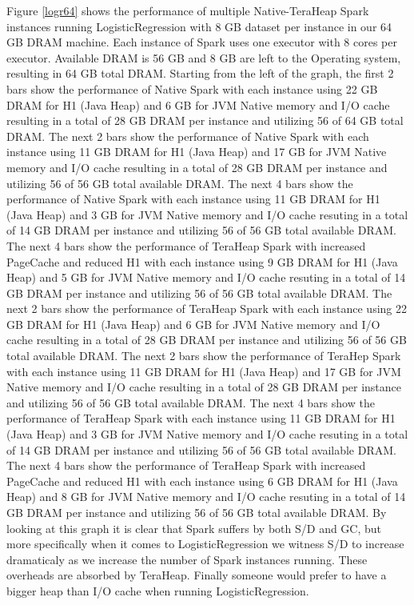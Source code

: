 \documentclass[twocolumn,10pt]{asme2e}
\begin{document}
Figure \ref{logr64} shows the performance of multiple Native-TeraHeap Spark instances running LogisticRegression with 8 GB dataset per instance in our 64 GB DRAM machine. Each instance of Spark uses one executor with 8 cores per executor. Available DRAM is 56 GB and 8 GB are left to the Operating system, resulting in 64 GB total DRAM. Starting from the left of the graph, the first 2 bars show the performance of Native Spark with each instance using 22 GB DRAM for H1 (Java Heap) and 6 GB for JVM Native memory and I/O cache resulting in a total of 28 GB DRAM per instance and utilizing 56 of 64 GB total DRAM. The next 2 bars show the performance of Native Spark with each instance using 11 GB DRAM for H1 (Java Heap) and 17 GB for JVM Native memory and I/O cache resulting in a total of 28 GB DRAM per instance and utilizing 56 of 56 GB total available DRAM. The next 4 bars show the performance of Native Spark with each instance using 11 GB DRAM for H1 (Java Heap) and 3 GB for JVM Native memory and I/O cache resuting in a total of 14 GB DRAM per instance and utilizing 56 of 56 GB total available DRAM. The next 4 bars show the performance of TeraHeap Spark with increased PageCache and reduced H1 with each instance using 9 GB DRAM for H1 (Java Heap) and 5 GB for JVM Native memory and I/O cache resuting in a total of 14 GB DRAM per instance and utilizing 56 of 56 GB total available DRAM. 
The next 2 bars show the performance of TeraHeap Spark with each instance using 22 GB DRAM for H1 (Java Heap) and 6 GB for JVM Native memory and I/O cache resulting in a total of 28 GB DRAM per instance and utilizing 56 of 56 GB total available DRAM. The next 2 bars show the performance of TeraHep Spark with each instance using 11 GB DRAM for H1 (Java Heap) and 17 GB for JVM Native memory and I/O cache resulting in a total of 28 GB DRAM per instance and utilizing 56 of 56 GB total available DRAM. The next 4 bars show the performance of TeraHeap Spark with each instance using 11 GB DRAM for H1 (Java Heap) and 3 GB for JVM Native memory and I/O cache resuting in a total of 14 GB DRAM per instance and utilizing 56 of 56 GB total available DRAM. The next 4 bars show the performance of TeraHeap Spark with increased PageCache and reduced H1 with each instance using 6 GB DRAM for H1 (Java Heap) and 8 GB for JVM Native memory and I/O cache resuting in a total of 14 GB DRAM per instance and utilizing 56 of 56 GB total available DRAM.  
By looking at this graph it is clear that Spark suffers by both S/D and GC, but more specifically when it comes to LogisticRegression we witness S/D to increase dramaticaly as we increase the number of Spark instances running. These overheads are absorbed by TeraHeap. Finally someone would prefer to have a bigger heap than I/O cache when running LogisticRegression.
\end{document}
